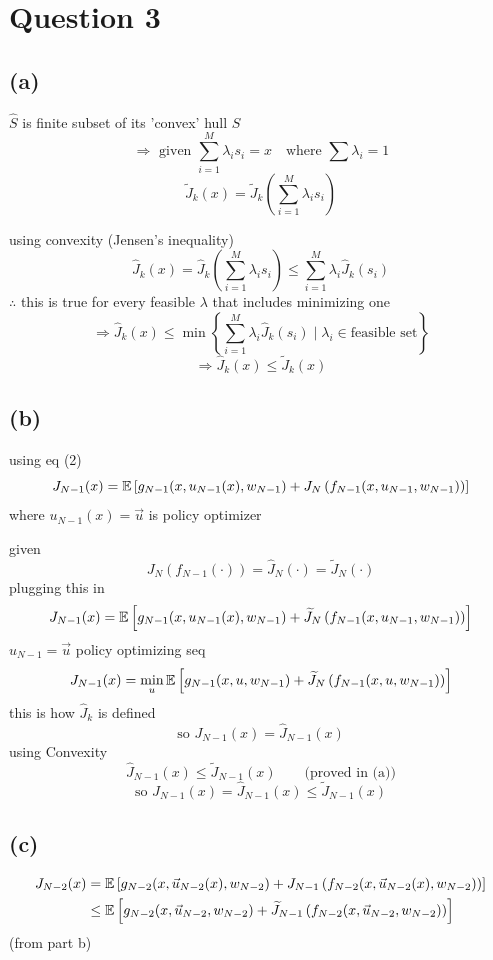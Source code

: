 \begingroup
\setlength{\parskip}{3pt}
\setlength{\abovedisplayskip}{7pt}
\setlength{\belowdisplayskip}{7pt}
\section{Question 3}
\subsection*{(a)}

$\widehat S$ is finite subset of its 'convex' hull $S$
\[
\Rightarrow\text{ given }\sum_{i=1}^M\lambda_i s_i=x
\quad\text{where }\sum\lambda_i=1
\]
\[
\widetilde J_k(x)=\widetilde J_k\left(\sum_{i=1}^M\lambda_i s_i\right)
\]

using convexity (Jensen's inequality)
\[
\widehat J_k(x)=\widehat J_k\left(\sum_{i=1}^M\lambda_i s_i\right)
\le\sum_{i=1}^M\lambda_i\widehat J_k(s_i)
\]
$\therefore$ this is true for every feasible $\lambda$
that includes minimizing one
\[
\Rightarrow\widehat J_k(x)\le
\min\left\{\sum_{i=1}^M\lambda_i\widehat J_k(s_i)
\mid\lambda_i\in\text{feasible set}\right\}
\]
\[
\Rightarrow\boxed{\widehat J_k(x)\le\widetilde J_k(x)}
\]

\subsection*{(b)}
using eq (2)
\[
J_{N-1}(x)=\mathbb{E}\left[g_{N-1}(x,u_{N-1}(x),w_{N-1})
+J_N\left(f_{N-1}(x,u_{N-1},w_{N-1})\right)\right]
\]
where $u_{N-1}(x)=\vec u$ is policy optimizer

given
\[
J_N\left(f_{N-1}(\cdot)\right)=\widehat J_N(\cdot)=\widetilde J_N(\cdot)
\]
plugging this in
\[
J_{N-1}(x)=\mathbb{E}\left[g_{N-1}(x,u_{N-1}(x),w_{N-1})
+\widetilde J_N\left(f_{N-1}(x,u_{N-1},w_{N-1})\right)\right]
\]
$u_{N-1}=\vec u$ policy optimizing seq
\[
J_{N-1}(x)=\min_u\mathbb{E}\left[g_{N-1}(x,u,w_{N-1})
+\widetilde J_N\left(f_{N-1}(x,u,w_{N-1})\right)\right]
\]
this is how $\widehat J_k$ is defined
\[
\text{so }J_{N-1}(x)=\widehat J_{N-1}(x)
\]
using Convexity
\[
\widehat J_{N-1}(x)\le\widetilde J_{N-1}(x)\qquad\text{(proved in (a))}
\]
\[
\text{so }\boxed{J_{N-1}(x)=\widehat J_{N-1}(x)\le\widetilde J_{N-1}(x)}
\]

\clearpage
\subsection*{(c)}
\begin{align*}
J_{N-2}(x)&=\mathbb{E}\left[g_{N-2}(x,\vec u_{N-2}(x),w_{N-2})
+J_{N-1}\left(f_{N-2}(x,\vec u_{N-2}(x),w_{N-2})\right)\right]\\
&\le\mathbb{E}\left[g_{N-2}(x,\vec u_{N-2},w_{N-2})
+\widetilde J_{N-1}\left(f_{N-2}(x,\vec u_{N-2},w_{N-2})\right)\right]
\end{align*}
\hfill (from part b)

